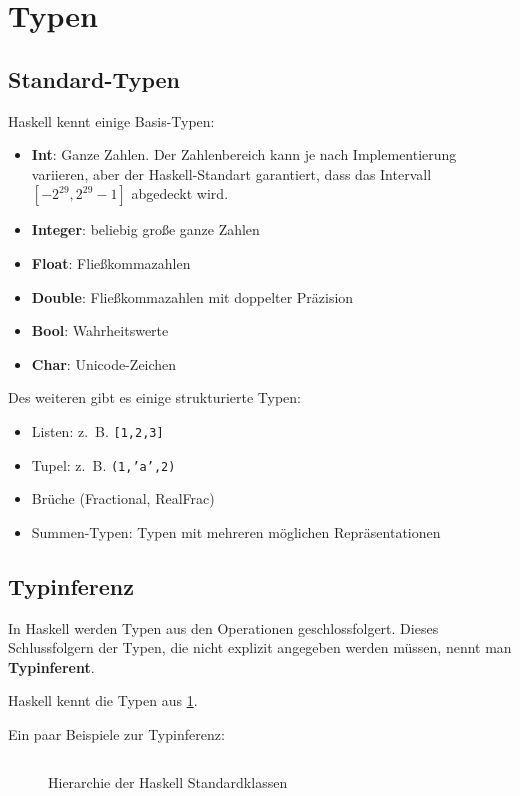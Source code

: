 \section{Typen}
\subsection{Standard-Typen}
Haskell kennt einige Basis-Typen:
\begin{itemize}
  \item \textbf{Int}: Ganze Zahlen. Der Zahlenbereich kann je nach Implementierung variieren,
  aber der Haskell-Standart garantiert, dass das Intervall 
  $[-2^{29}, 2^{29}-1]$ abgedeckt wird.
  \item \textbf{Integer}: beliebig große ganze Zahlen
  \item \textbf{Float}: Fließkommazahlen
  \item \textbf{Double}: Fließkommazahlen mit doppelter Präzision
  \item \textbf{Bool}: Wahrheitswerte
  \item \textbf{Char}: Unicode-Zeichen
\end{itemize}

Des weiteren gibt es einige strukturierte Typen:
\begin{itemize}
  \item Listen: z.~B. \texttt{[1,2,3]}
  \item Tupel: z.~B. \texttt{(1,'a',2)}
  \item Brüche (Fractional, RealFrac)
  \item Summen-Typen: Typen mit mehreren möglichen Repräsentationen
\end{itemize}

\subsection{Typinferenz}
In Haskell werden Typen aus den Operationen geschlossfolgert. Dieses
Schlussfolgern der Typen, die nicht explizit angegeben werden müssen,
nennt man \textbf{Typinferent}.


Haskell kennt die Typen aus \cref{fig:haskell-type-hierarchy}.

Ein paar Beispiele zur Typinferenz:
\inputminted[numbersep=5pt, tabsize=4]{haskell}{scripts/haskell/typinferenz.sh}

\begin{figure}[htp]
    \centering
    \resizebox{0.9\linewidth}{!}{}
    \caption{Hierarchie der Haskell Standardklassen}
    \label{fig:haskell-type-hierarchy}
\end{figure}

